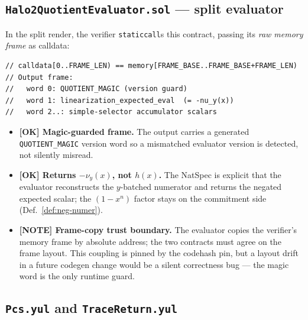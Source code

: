 \subsection{\texttt{Halo2QuotientEvaluator.sol} --- split evaluator}
\label{sec:quotient-evaluator}

In the split render, the verifier \texttt{staticcall}s this contract,
passing its \emph{raw memory frame} as calldata:
\begin{lstlisting}[style=plain]
// calldata[0..FRAME_LEN) == memory[FRAME_BASE..FRAME_BASE+FRAME_LEN)
// Output frame:
//   word 0: QUOTIENT_MAGIC (version guard)
//   word 1: linearization_expected_eval  (= -nu_y(x))
//   word 2..: simple-selector accumulator scalars
\end{lstlisting}
\begin{itemize}
  \item \textcolor{tracegreen}{\textbf{[OK] Magic-guarded frame.}} The
        output carries a generated \texttt{QUOTIENT\_MAGIC} version word
        so a mismatched evaluator version is detected, not silently
        misread.
  \item \textcolor{tracegreen}{\textbf{[OK] Returns $-\nu_y(x)$, not
        $h(x)$.}} The NatSpec is explicit that the evaluator
        reconstructs the $y$-batched numerator and returns the negated
        expected scalar; the $(1-x^n)$ factor stays on the commitment
        side (Def.~\ref{def:neg-numer}).
  \item \textcolor{mathpurple}{\textbf{[NOTE] Frame-copy trust boundary.}}
        The evaluator copies the verifier's memory frame by absolute
        address; the two contracts must agree on the frame layout. This
        coupling is pinned by the codehash pin, but a layout drift in a
        future codegen change would be a silent correctness bug --- the
        magic word is the only runtime guard.
\end{itemize}

\subsection{\texttt{Pcs.yul} and \texttt{TraceReturn.yul}}
\label{sec:pcs-trace-return}

